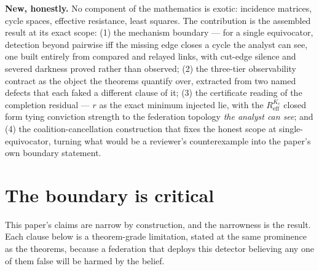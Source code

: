 \documentclass[11pt,a4paper]{article}
\begin{document}
\textbf{New, honestly.} No component of the mathematics is exotic: incidence matrices, cycle spaces, effective resistance,
least squares. The contribution is the assembled result at its exact scope: (1) the mechanism boundary --- for a single
equivocator, detection beyond pairwise iff the missing edge closes a cycle the analyst can see, one built entirely from
compared and relayed links, with cut-edge silence and severed darkness proved rather than
observed; (2) the three-tier observability contract as the object the theorems quantify over, extracted from two named
defects that each faked a different clause of it; (3) the certificate reading of the completion residual --- $r$ as the
exact minimum injected lie, with the $R^{K_c}_{\mathrm{eff}}$ closed form tying conviction strength to the federation
topology \emph{the analyst can see}; and
(4) the coalition-cancellation construction that fixes the honest scope at single-equivocator, turning what would be a
reviewer's counterexample into the paper's own boundary statement.

\section{The boundary is critical}\label{sec:boundary}

This paper's claims are narrow by construction, and the narrowness is the result. Each clause below is a theorem-grade
limitation, stated at the same prominence as the theorems, because a federation that deploys this detector believing any
one of them false will be harmed by the belief.
\end{document}
